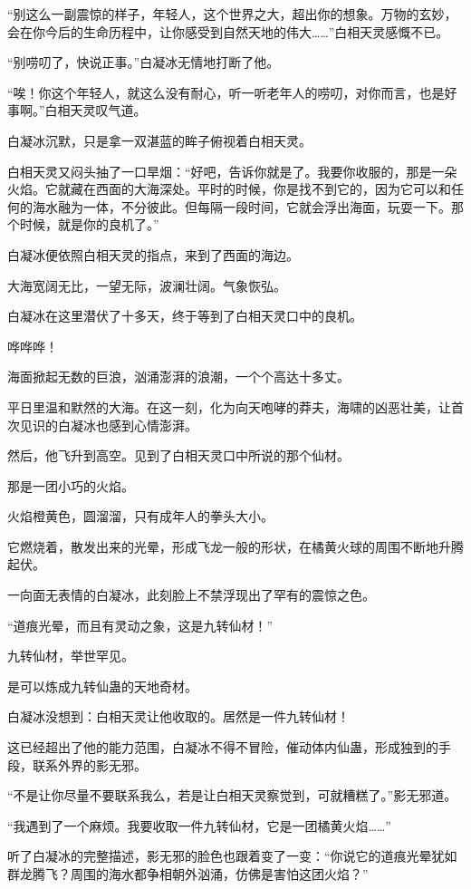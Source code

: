 \begin{this_body}
“别这么一副震惊的样子，年轻人，这个世界之大，超出你的想象。万物的玄妙，会在你今后的生命历程中，让你感受到自然天地的伟大……”白相天灵感慨不已。

“别唠叨了，快说正事。”白凝冰无情地打断了他。

“唉！你这个年轻人，就这么没有耐心，听一听老年人的唠叨，对你而言，也是好事啊。”白相天灵叹气道。

白凝冰沉默，只是拿一双湛蓝的眸子俯视着白相天灵。

白相天灵又闷头抽了一口旱烟：“好吧，告诉你就是了。我要你收服的，那是一朵火焰。它就藏在西面的大海深处。平时的时候，你是找不到它的，因为它可以和任何的海水融为一体，不分彼此。但每隔一段时间，它就会浮出海面，玩耍一下。那个时候，就是你的良机了。”

白凝冰便依照白相天灵的指点，来到了西面的海边。

大海宽阔无比，一望无际，波澜壮阔。气象恢弘。

白凝冰在这里潜伏了十多天，终于等到了白相天灵口中的良机。

哗哗哗！

海面掀起无数的巨浪，汹涌澎湃的浪潮，一个个高达十多丈。

平日里温和默然的大海。在这一刻，化为向天咆哮的莽夫，海啸的凶恶壮美，让首次见识的白凝冰也感到心情澎湃。

然后，他飞升到高空。见到了白相天灵口中所说的那个仙材。

那是一团小巧的火焰。

火焰橙黄色，圆溜溜，只有成年人的拳头大小。

它燃烧着，散发出来的光晕，形成飞龙一般的形状，在橘黄火球的周围不断地升腾起伏。

一向面无表情的白凝冰，此刻脸上不禁浮现出了罕有的震惊之色。

“道痕光晕，而且有灵动之象，这是九转仙材！”

九转仙材，举世罕见。

是可以炼成九转仙蛊的天地奇材。

白凝冰没想到：白相天灵让他收取的。居然是一件九转仙材！

这已经超出了他的能力范围，白凝冰不得不冒险，催动体内仙蛊，形成独到的手段，联系外界的影无邪。

“不是让你尽量不要联系我么，若是让白相天灵察觉到，可就糟糕了。”影无邪道。

“我遇到了一个麻烦。我要收取一件九转仙材，它是一团橘黄火焰……”

听了白凝冰的完整描述，影无邪的脸色也跟着变了一变：“你说它的道痕光晕犹如群龙腾飞？周围的海水都争相朝外汹涌，仿佛是害怕这团火焰？”


\end{this_body}
